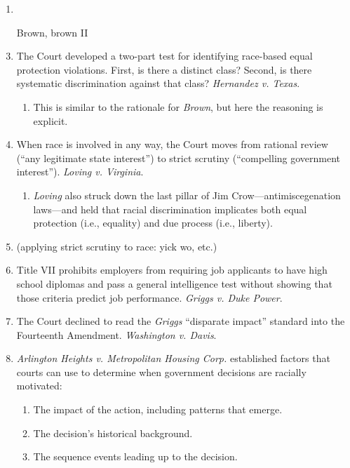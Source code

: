 \begin{enumerate}
    \item %
    \item [Brown, brown II] %
    \item The Court developed a two-part test for identifying race-based equal 
    protection violations. First, is there a distinct class? Second, is there 
    systematic discrimination against that class? \emph{Hernandez v. Texas}.
    \begin{enumerate}
        \item This is similar to the rationale for \emph{Brown}, but here the 
        reasoning is explicit.
    \end{enumerate}
    \item When race is involved in any way, the Court moves from rational 
    review (``any legitimate state interest'') to strict scrutiny 
    (``compelling government interest''). \emph{Loving v. Virginia}.
    \begin{enumerate}
        \item \emph{Loving} also struck down the last pillar of Jim 
        Crow---antimiscegenation laws---and held that racial discrimination 
        implicates both equal protection (i.e., equality) and due process 
        (i.e., liberty).
    \end{enumerate}
    \item (applying strict scrutiny to race: yick wo, etc.) %
    \item Title VII prohibits employers from requiring job applicants to have 
    high school diplomas and pass a general intelligence test without showing 
    that those criteria predict job performance. \emph{Griggs v. Duke Power}.
    \item The Court declined to read the \emph{Griggs} ``disparate impact'' 
    standard into the Fourteenth Amendment. \emph{Washington v. Davis}.
    \item \emph{Arlington Heights v. Metropolitan Housing Corp.} established 
    factors that courts can use to determine when government decisions are 
    racially motivated:
    \begin{enumerate}
        \item The impact of the action, including patterns that emerge.
        \item The decision's historical background.
        \item The sequence events leading up to the decision.

\end{enumerate}
\end{enumerate}

